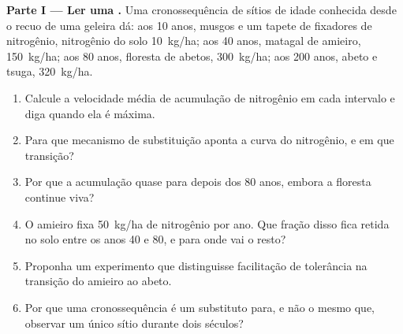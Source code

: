 \begin{problem}
\label{pb:b1:ecosystem-dynamics:1}

\medskip
\noindent\textbf{Parte I --- Ler uma .}
Uma cronossequência de sítios de idade conhecida desde o recuo de uma
geleira dá: aos 10 anos, musgos e um tapete de fixadores de
nitrogênio, nitrogênio do solo \qty{10}{kg/ha}; aos 40 anos, matagal
de amieiro, \qty{150}{kg/ha}; aos 80 anos, floresta de abetos,
\qty{300}{kg/ha}; aos 200 anos, abeto e tsuga, \qty{320}{kg/ha}.
\begin{enumerate}
  \item Calcule a velocidade média de acumulação de nitrogênio em cada
        intervalo e diga quando ela é máxima.
  \item Para que mecanismo de substituição aponta a curva do
        nitrogênio, e em que transição?
  \item Por que a acumulação quase para depois dos 80 anos, embora a
        floresta continue viva?
  \item O amieiro fixa \qty{50}{kg/ha} de nitrogênio por ano. Que
        fração disso fica retida no solo entre os anos 40 e 80, e para
        onde vai o resto?
  \item Proponha um experimento que distinguisse facilitação de
        tolerância na transição do amieiro ao abeto.
  \item Por que uma cronossequência é um substituto para, e não o
        mesmo que, observar um único sítio durante dois séculos?
\end{enumerate}


\end{problem}
